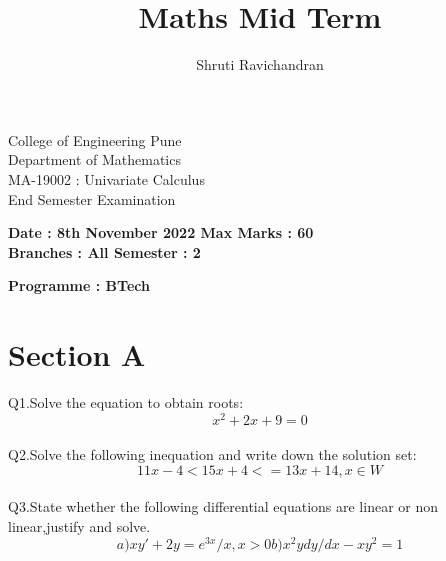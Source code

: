 \documentclass[12pt]{article}
\begin{document}
	\title{Maths Mid Term}
	\author{Shruti Ravichandran}
	\maketitle
	\newpage
	\tableofcontents
	\newpage
	{ \begin{center}
			College of Engineering Pune \\Department of Mathematics \\MA-19002 : Univariate Calculus \\End Semester Examination
		\end{center}
	}\raggedleft
	{\bf Date : 8th November 2022      \hspace*{\fill}            Max Marks : 60}
	\\{\bf Branches : All        \hspace*{\fill}                    Semester : 2}	       
	\\\raggedright{\bf Programme : BTech}   

	\raggedright\section*{Section A}
	Q1.Solve the equation to obtain roots:
	\begin{equation*}
		x^2+2x+9=0
	\end{equation*}
\\
	Q2.Solve the following inequation and write down the solution set:
	\begin{equation*}
		11x-4<15x+4<=13x+14,x\in W
	\end{equation*}
\\
	Q3.State whether the following differential equations are linear or non linear,justify and solve.
	\begin{equation*}
		a)xy'+2y=e^{3x}/x,x>0 
		b)x^2ydy/dx-xy^2=1 
	\end{equation*}
\\
\end{document}

